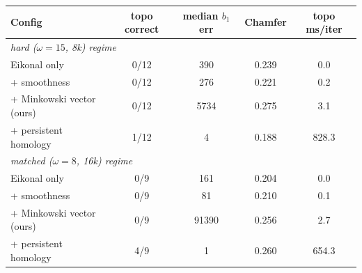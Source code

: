 \begin{tabular}{lcccc}
\toprule
Config & topo correct & median $b_1$ err & Chamfer & topo ms/iter \\
\midrule
\multicolumn{5}{l}{\emph{hard ($\omega{=}15$, 8k) regime}} \\
Eikonal only & 0/12 & 390 & 0.239 & 0.0 \\
+ smoothness & 0/12 & 276 & 0.221 & 0.2 \\
+ Minkowski vector (ours) & 0/12 & 5734 & 0.275 & 3.1 \\
+ persistent homology & 1/12 & 4 & 0.188 & 828.3 \\
\midrule
\multicolumn{5}{l}{\emph{matched ($\omega{=}8$, 16k) regime}} \\
Eikonal only & 0/9 & 161 & 0.204 & 0.0 \\
+ smoothness & 0/9 & 81 & 0.210 & 0.1 \\
+ Minkowski vector (ours) & 0/9 & 91390 & 0.256 & 2.7 \\
+ persistent homology & 4/9 & 1 & 0.260 & 654.3 \\
\bottomrule
\end{tabular}